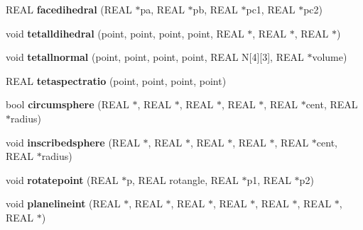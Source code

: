 \begin{DoxyCompactItemize}
\item 
\hypertarget{classtetgenmesh_a3d8d0e63dea7f1cd6229ae100915cace}{R\-E\-A\-L {\bfseries facedihedral} (R\-E\-A\-L $\ast$pa, R\-E\-A\-L $\ast$pb, R\-E\-A\-L $\ast$pc1, R\-E\-A\-L $\ast$pc2)}\label{classtetgenmesh_a3d8d0e63dea7f1cd6229ae100915cace}

\item 
\hypertarget{classtetgenmesh_aa1fe97a43b9339b9c059ba90cf231cb1}{void {\bfseries tetalldihedral} (point, point, point, point, R\-E\-A\-L $\ast$, R\-E\-A\-L $\ast$, R\-E\-A\-L $\ast$)}\label{classtetgenmesh_aa1fe97a43b9339b9c059ba90cf231cb1}

\item 
\hypertarget{classtetgenmesh_a1d88027411fb3b8f7c3752b1a0b3eb14}{void {\bfseries tetallnormal} (point, point, point, point, R\-E\-A\-L N\mbox{[}4\mbox{]}\mbox{[}3\mbox{]}, R\-E\-A\-L $\ast$volume)}\label{classtetgenmesh_a1d88027411fb3b8f7c3752b1a0b3eb14}

\item 
\hypertarget{classtetgenmesh_a891ca3fde48f9e3378e14d5537216853}{R\-E\-A\-L {\bfseries tetaspectratio} (point, point, point, point)}\label{classtetgenmesh_a891ca3fde48f9e3378e14d5537216853}

\item 
\hypertarget{classtetgenmesh_aa7ba47e0a0433aa33adc5310c9cf1b84}{bool {\bfseries circumsphere} (R\-E\-A\-L $\ast$, R\-E\-A\-L $\ast$, R\-E\-A\-L $\ast$, R\-E\-A\-L $\ast$, R\-E\-A\-L $\ast$cent, R\-E\-A\-L $\ast$radius)}\label{classtetgenmesh_aa7ba47e0a0433aa33adc5310c9cf1b84}

\item 
\hypertarget{classtetgenmesh_a3e076c327d91d6dfe5c9bd87356232bd}{void {\bfseries inscribedsphere} (R\-E\-A\-L $\ast$, R\-E\-A\-L $\ast$, R\-E\-A\-L $\ast$, R\-E\-A\-L $\ast$, R\-E\-A\-L $\ast$cent, R\-E\-A\-L $\ast$radius)}\label{classtetgenmesh_a3e076c327d91d6dfe5c9bd87356232bd}

\item 
\hypertarget{classtetgenmesh_afbefb1e04f427ca303793d1c67a11a15}{void {\bfseries rotatepoint} (R\-E\-A\-L $\ast$p, R\-E\-A\-L rotangle, R\-E\-A\-L $\ast$p1, R\-E\-A\-L $\ast$p2)}\label{classtetgenmesh_afbefb1e04f427ca303793d1c67a11a15}

\item 
\hypertarget{classtetgenmesh_a883cf2b9f86e671d486bc33b37b4efe6}{void {\bfseries planelineint} (R\-E\-A\-L $\ast$, R\-E\-A\-L $\ast$, R\-E\-A\-L $\ast$, R\-E\-A\-L $\ast$, R\-E\-A\-L $\ast$, R\-E\-A\-L $\ast$, R\-E\-A\-L $\ast$)}\label{classtetgenmesh_a883cf2b9f86e671d486bc33b37b4efe6}


\end{DoxyCompactItemize}
